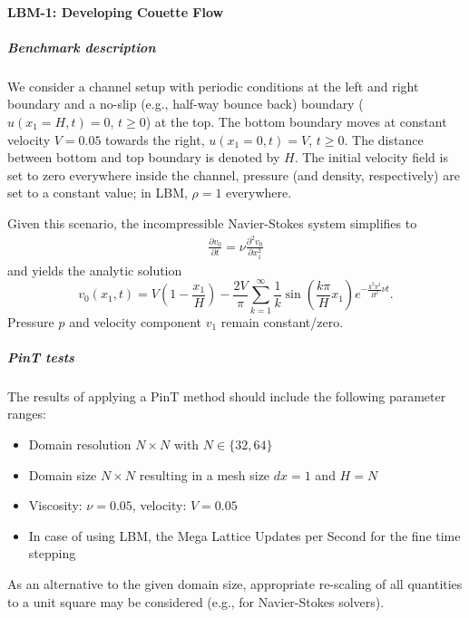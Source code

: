 \paragraph{LBM-1: Developing Couette Flow}

\subparagraph{Benchmark description}

We consider a channel setup with periodic conditions at the left and right boundary and a no-slip (e.g., half-way bounce back) boundary ($u(x_1=H,t)=0$, $t\geq 0$) at the top.
The bottom boundary moves at constant velocity $V=0.05$ towards the right, $u(x_1=0,t) = V$, $t\geq 0$.
The distance between bottom and top boundary is denoted by $H$.
The initial velocity field is set to zero everywhere inside the channel, pressure (and density, respectively) are set to a constant value; in LBM, $\rho=1$ everywhere.

Given this scenario, the incompressible Navier-Stokes system simplifies to~\cite{transientPlaneCouetteFlow}
\begin{eqnarray}
	\frac{\partial v_0}{\partial t} = \nu \frac{\partial^2 v_0}{\partial x_1^2}
\end{eqnarray}
and yields the analytic solution
$$
	v_0(x_1,t) = V\left(1 - \frac{x_1}{H} \right) - \frac{2V}{\pi}\sum_{k=1}^{\infty}\frac{1}{k}\sin\left(\frac{k\pi}{H} x_1\right)e^{-\frac{k^2\pi^2}{H^2}\nu t}.
$$
Pressure $p$ and velocity component $v_1$ remain constant/zero.




\subparagraph{PinT tests}

The results of applying a PinT method should include the following parameter ranges:

\begin{itemize}
	\item Domain resolution $N\times N$ with $N \in \{ 32, 64\}$
	\item Domain size $N \times N$ resulting in a mesh size $dx=1$ and $H=N$
	\item Viscosity: $\nu = 0.05$, velocity: $V=0.05$
	\item In case of using LBM, the Mega Lattice Updates per Second for the fine time stepping
\end{itemize}
As an alternative to the given domain size, appropriate re-scaling of all quantities to a unit square may be considered (e.g., for Navier-Stokes solvers).

